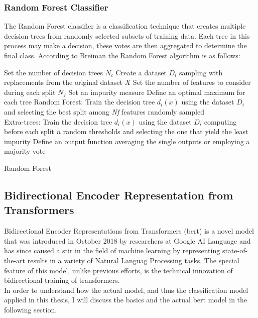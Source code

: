 \documentclass[a4paper, 11pt,titlepage,oneside,openany]{book}
\begin{document}
\subsubsection{Random Forest Classifier}
The Random Forest classifier is a classification technique that creates multiple decision trees from randomly selected subsets of training data. Each tree in this process may make a decision, these votes are then aggregated to determine the final class. According to Breiman \cite{randomforest} the Random Forest algorithm is as follows:\\

\begin{algorithm}[H]
	\DontPrintSemicolon
	Set the number of decision trees $N_c$\;
		{Create a dataset $D_i$ sampling with replacements from the original dataset $X$}
	Set the number of features  to consider during each split $N_f$\;
	Set an impurity measure\;
	Define an optimal maximum for each tree\;
		{Random Forest: Train the decision tree $d_i(x)$ using the dataset $D_i$ and selecting the best split among \textit{Nf} features randomly sampled \\
		Extra-trees:  Train the decision tree $d_i(x)$ using the dataset $D_i$ computing before each split $n$ random thresholds and selecting the one that yield the least impurity}
	Define an output function averaging the single outputs or employing a majority vote
	\caption{Random Forest}
\end{algorithm}

\newpage
\subsection{Bidirectional Encoder Representation from Transformers}
Bidirectional Encoder Representations from Transformers (\gls{bert}) \cite{bert} is a novel model that was introduced in October 2018 by researchers at Google AI Language and has since caused a stir in the field of machine learning by representing state-of-the-art results in a variety of Natural Languag Processing tasks. The special feature of this model, unlike previous efforts, is the technical innovation of bidirectional training of transformers. \\
\noindent In order to understand how the actual model, and thus the classification model applied in this thesis, I will discuss the basics and the actual \gls{bert} model in the following section.
\end{document}
